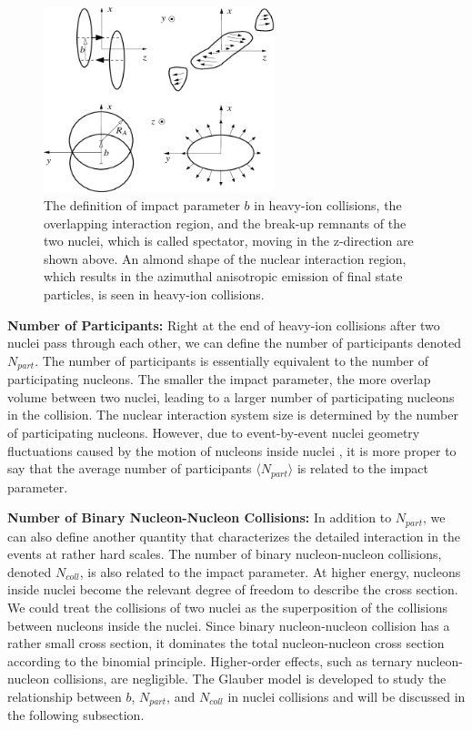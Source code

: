 \begin{figure}[hbtp]
\begin{center}
\includegraphics[width=0.60\textwidth]{Figures/Chapter1/IPHIColl.png}
\caption{The definition of impact parameter $b$ in heavy-ion collisions, the overlapping interaction region, and the break-up remnants of the two nuclei, which is called spectator, moving in the z-direction are shown above. An almond shape of the nuclear interaction region, which results in the azimuthal anisotropic emission of final state particles, is seen in heavy-ion collisions.}
\label{IPHIColl}
\end{center}
\end{figure} 


\textbf{Number of Participants:} Right at the end of heavy-ion collisions after two nuclei pass through each other, we can define the number of participants denoted $N_{part}$. The number of participants is essentially equivalent to the number of participating nucleons. The smaller the impact parameter, the more overlap volume between two nuclei, leading to a larger number of participating nucleons in the collision. The nuclear interaction system size is determined by the number of participating nucleons. However, due to event-by-event nuclei geometry fluctuations caused by the motion of nucleons inside nuclei \cite{GuntherV3}, it is more proper to say that the average number of participants $\langle N_{part} \rangle$ is related to the impact parameter.

\textbf{Number of Binary Nucleon-Nucleon Collisions:} In addition to $N_{part}$, we can also define another quantity that characterizes the detailed interaction in the events at rather hard scales. The number of binary nucleon-nucleon collisions, denoted $N_{coll}$, is also related to the impact parameter. At higher energy, nucleons inside nuclei become the relevant degree of freedom to describe the cross section. We could treat the collisions of two nuclei as the superposition of the collisions between nucleons inside the nuclei. Since binary nucleon-nucleon collision has a rather small cross section, it dominates the total nucleon-nucleon cross section according to the binomial principle. Higher-order effects, such as ternary nucleon-nucleon collisions, are negligible. The Glauber model \cite{CentPlot} is developed to study the relationship between $b$, $N_{part}$, and $N_{coll}$ in nuclei collisions and will be discussed in the following subsection.


